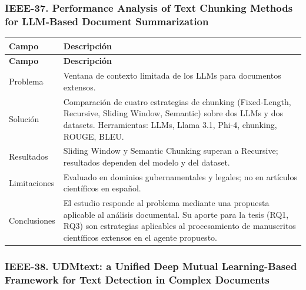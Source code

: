 \subsubsection*{IEEE-37. Performance Analysis of Text Chunking Methods for LLM-Based Document Summarization}

\begin{longtable}{@{}>{\raggedright\arraybackslash}p{}>{\raggedright\arraybackslash}p{}@{}}
\toprule
\textbf{Campo} & \textbf{Descripción} \\
\midrule
\endfirsthead
\toprule
\textbf{Campo} & \textbf{Descripción} \\
\midrule
\endhead
\bottomrule
\endfoot
\endlastfoot
Problema & Ventana de contexto limitada de los LLMs para documentos extensos. \\
Solución & Comparación de cuatro estrategias de chunking (Fixed-Length, Recursive, Sliding Window, Semantic) sobre dos LLMs y dos datasets. Herramientas: LLMs, Llama 3.1, Phi-4, chunking, ROUGE, BLEU. \\
Resultados & Sliding Window y Semantic Chunking superan a Recursive; resultados dependen del modelo y del dataset. \\
Limitaciones & Evaluado en dominios gubernamentales y legales; no en artículos científicos en español. \\
Conclusiones & El estudio responde al problema mediante una propuesta aplicable al análisis documental. Su aporte para la tesis (RQ1, RQ3) son estrategias aplicables al procesamiento de manuscritos científicos extensos en el agente propuesto. \\
\end{longtable}

\subsubsection*{IEEE-38. UDMtext: a Unified Deep Mutual Learning-Based Framework for Text Detection in Complex Documents}


